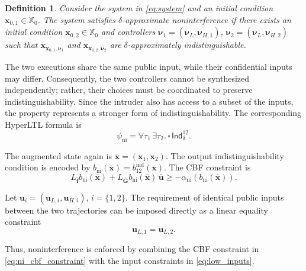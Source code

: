 \documentclass[journal,twoside,web]{ieeecolor}
\newtheorem{definition}[theorem]{Definition}
\begin{document}
\begin{definition} \label{def:noninterference}
    Consider the system in \eqref{eq:system} and an initial condition $\mathbf{x}_{0,1} \in \mathbb{X}_0$. The system satisfies $\delta$-\emph{approximate noninterference} if there exists an initial condition $\mathbf{x}_{0,2} \in \mathbb{X}_0$ and controllers $\boldsymbol{\nu}_1 = (\boldsymbol{\nu}_{L}, \boldsymbol{\nu}_{H,1})$, $\boldsymbol{\nu}_2 = (\boldsymbol{\nu}_{L}, \boldsymbol{\nu}_{H,2})$ such that $\mathbf{x}_{\mathbf{x}_{0,1}, \boldsymbol{\nu}_1}$ and $\mathbf{x}_{\mathbf{x}_{0,2}, \boldsymbol{\nu}_2}$ are $\delta$-approximately indistinguishable.
\end{definition}
The two executions share the same public input, while their confidential inputs may differ. Consequently, the two controllers cannot be synthesized independently; rather, their choices must be coordinated to preserve indistinguishability. Since the intruder also has access to a subset of the inputs, the property represents a stronger form of indistinguishability. The corresponding HyperLTL formula is
\begin{equation}
\label{eq:hyperltl_noninterference}
    \psi_{\mathrm{ni}} = \forall \tau_1 \, \exists \tau_2 . \, \square \, \mathsf{Ind}_{\delta}^{12}.
\end{equation}

The augmented state again is $\bar{\mathbf{x}} = (\mathbf{x}_1, \mathbf{x}_2)$. The output indistinguishability condition is encoded by $b_{\mathrm{ni}}(\bar{\mathbf{x}}) = b_{12}^{\mathrm{ind}}(\bar{\mathbf{x}})$.
The CBF constraint is
\begin{equation}
\label{eq:ni_cbf_constraint}
    L_{\bar{\mathbf{f}}} b_{\mathrm{ni}}(\bar{\mathbf{x}}) + L_{\bar{\mathbf{G}}} b_{\mathrm{ni}}(\bar{\mathbf{x}}) \, \bar{\mathbf{u}} \ge -\alpha_{\mathrm{ni}} \left( b_{\mathrm{ni}}(\bar{\mathbf{x}}) \right).
\end{equation}

Let $\mathbf{u}_i = (\mathbf{u}_{L, i}, \mathbf{u}_{H,i})$, $i= \{1, 2\}$. The requirement of identical public inputs between the two trajectories can be imposed directly as a linear equality constraint 
\begin{equation} \label{eq:low_inputs}
    \mathbf{u}_{L,1} = \mathbf{u}_{L,2}.
\end{equation}

Thus, noninterference is enforced by combining the CBF constraint in \eqref{eq:ni_cbf_constraint} with the input constraints in \eqref{eq:low_inputs}.
\end{document}

